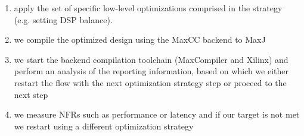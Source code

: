 \begin{enumerate}

\item apply the set of specific low-level optimizations comprised in
  the strategy (e.g. setting DSP balance).

\item  we compile the optimized
  design using the MaxCC backend to MaxJ

\item we start the backend compilation toolchain (MaxCompiler
  and Xilinx) and perform an analysis of the reporting information,
  based on which we either restart the flow with the next optimization
  strategy step or proceed to the next step

\item we measure NFRs such as performance or latency and if our target
  is not met we restart using a different optimization strategy

\end{enumerate}


